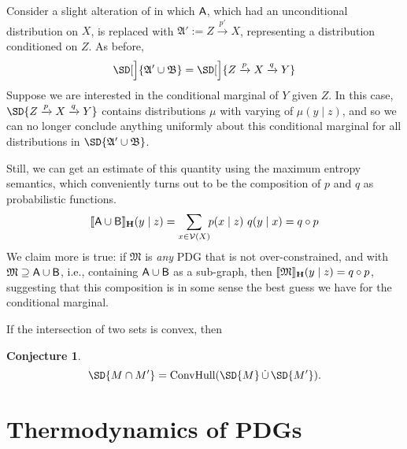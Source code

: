 \documentclass{article}
\theoremstyle{plain}
\newtheorem{conj}[theorem]{Conjecture}
\theoremstyle{definition}
\newenvironment{example}
	{\pushQED{\qed}\renewcommand{\qedsymbol}{$\triangle$}\examplex}
	{\popQED\endexamplex%
}
\theoremstyle{remark}
\DeclarePairedDelimiter{\bbr}{\llbracket}{\rrbracket}
\newcommand\MaxEnt{_{\mathbf H}}
\newcommand{\V}{\mathcal V}
\newcommand{\dg}[1]{\mathfrak{#1}}
\numberwithin{equation}{section}
\begin{document}
\begin{vfull}
	\begin{example}[composition]
		Consider a slight alteration of  in which $\sf A$, which had an unconditional distribution on $X$, is replaced with $\dg A' := Z \xrightarrow{p'} X$, representing a distribution conditioned on $Z$. 
		As before,
		\[ \SD[\Big]{{\dg A' \cup \dg B}} = \SD[\Big]{{Z} \xrightarrow{p} X \xrightarrow{q} Y} \]
		Suppose we are interested in the conditional marginal of $Y$ given $Z$. In this case, $\SD{{Z} \xrightarrow{p} X \xrightarrow{q} Y} $ contains distributions $\mu$ with varying of $\mu(y \mid z)$, and so we can no longer conclude anything uniformly about this conditional marginal for all distributions in $\SD{{\dg A' \cup \dg B}}$. 
		
		Still, we can get an estimate of this quantity using the maximum entropy semantics, which conveniently turns out to be the composition of $p$ and $q$ as probabilistic functions.
		$$ \bbr{{\sf A \cup B}}\MaxEnt(y \mid z) = \sum_{x \in \V(X)}\!\! p (x \mid z)\ q(y \mid x) = q \circ p $$
		We claim more is true: if $\dg M$ is \emph{any} PDG that is not over-constrained, and with $\dg M \supseteq \sf A \cup B$, i.e., containing $\sf A \cup B$ as a sub-graph, then
		$ \bbr{\dg M}\MaxEnt(y \mid z) = q \circ p$,
		suggesting that this composition is in some sense the best guess we have for the conditional marginal. 
	\end{example}

	\begin{vleftovers}
	If the intersection of two sets is convex, then 
	\begin{conj}\label{prop:intersect-set-semantics}
		\[ \SD{M \cap M'} = \text{ConvHull}(\SD{M} \mathop{\dot\cup} \SD{M'}).\]
	\end{conj}
	\end{vleftovers}
\end{vfull}
	
	\section{Thermodynamics of PDGs}\label{sec:thermo}
	
\end{document}
